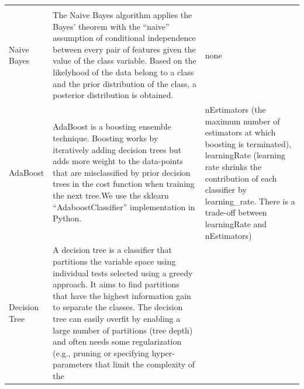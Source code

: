 \documentclass[]{article}
\begin{document}
\begin{longtable}[]{@{}lll@{}}
\begin{minipage}[t]{0.25\columnwidth}
\end{minipage}\tabularnewline
\begin{minipage}[t]{0.12\columnwidth}\raggedright\strut
Naive Bayes\strut
\end{minipage} & \begin{minipage}[t]{0.55\columnwidth}\raggedright\strut
The Naive Bayes algorithm applies the Bayes' theorem with the ``naive''
assumption of conditional independence between every pair of features
given the value of the class variable. Based on the likelyhood of the
data belong to a class and the prior distribution of the class, a
posterior distribution is obtained.\strut
\end{minipage} & \begin{minipage}[t]{0.25\columnwidth}\raggedright\strut
none\strut
\end{minipage}\tabularnewline
\begin{minipage}[t]{0.12\columnwidth}\raggedright\strut
AdaBoost\strut
\end{minipage} & \begin{minipage}[t]{0.55\columnwidth}\raggedright\strut
AdaBoost is a boosting ensemble technique. Boosting works by iteratively
adding decision trees but adds more weight to the data-points that are
misclassified by prior decision trees in the cost function when training
the next tree.We use the sklearn ``AdaboostClassifier'' implementation
in Python.\strut
\end{minipage} & \begin{minipage}[t]{0.25\columnwidth}\raggedright\strut
nEstimators (the maximum number of estimators at which boosting is
terminated), learningRate (learning rate shrinks the contribution of
each classifier by learning\_rate. There is a trade-off between
learningRate and nEstimators)\strut
\end{minipage}\tabularnewline
\begin{minipage}[t]{0.12\columnwidth}\raggedright\strut
Decision Tree\strut
\end{minipage} & \begin{minipage}[t]{0.55\columnwidth}\raggedright\strut
A decision tree is a classifier that partitions the variable space using
individual tests selected using a greedy approach. It aims to find
partitions that have the highest information gain to separate the
classes. The decision tree can easily overfit by enabling a large number
of partitions (tree depth) and often needs some regularization (e.g.,
pruning or specifying hyper-parameters that limit the complexity of the

\end{minipage}
\end{longtable}
\end{document}
